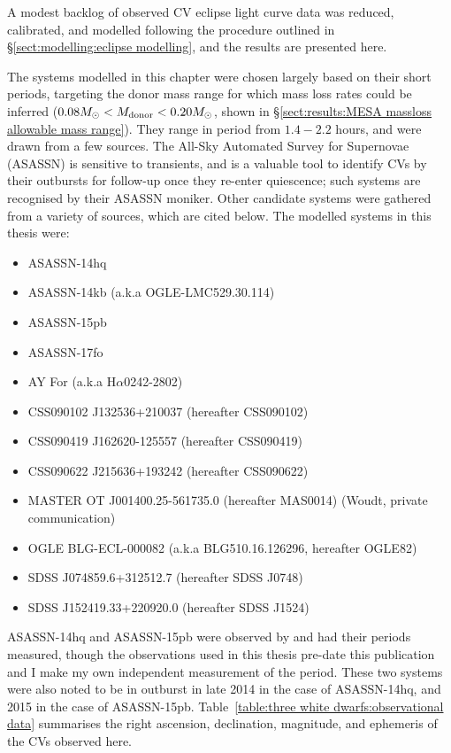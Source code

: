 \label{chpt:characterisation of 12 new CVs} %

A modest backlog of observed CV eclipse light curve data was reduced, calibrated, and modelled following the procedure outlined in \S\ref{sect:modelling:eclipse modelling}, and the results are presented here.

The systems modelled in this chapter were chosen largely based on their short periods, targeting the donor mass range for which mass loss rates could be inferred ($0.08 M_\odot < M_{\rm donor} < 0.20 M_\odot$, shown in \S\ref{sect:results:MESA massloss allowable mass range}). They range in period from $1.4 - 2.2$ hours, and were drawn from a few sources.
The All-Sky Automated Survey for Supernovae (ASASSN) \citep{shappee2014} is sensitive to transients, and is a valuable tool to identify CVs by their outbursts for follow-up once they re-enter quiescence; such systems are recognised by their ASASSN moniker.
Other candidate systems were gathered from a variety of sources, which are cited below.
The modelled systems in this thesis were:
\begin{itemize}
    \setlength\itemsep{0em}
    \item ASASSN-14hq
    \item ASASSN-14kb (a.k.a OGLE-LMC529.30.114)
    \item ASASSN-15pb
    \item ASASSN-17fo
    \item AY For (a.k.a H$\alpha$0242-2802) \citep{woudt2004}
    \item CSS090102 J132536+210037 (hereafter CSS090102) \citep{kato2012}
    \item CSS090419 J162620-125557 (hereafter CSS090419) \citep{kato2012}
    \item CSS090622 J215636+193242 (hereafter CSS090622) \citep{kato2012,thorstensen2016}
    \item MASTER OT J001400.25-561735.0 (hereafter MAS0014) (Woudt, private communication)
    \item OGLE BLG-ECL-000082 (a.k.a BLG510.16.126296, hereafter OGLE82) \citep{soszynski2016}
    \item SDSS J074859.6+312512.7 (hereafter SDSS J0748) \citep{kato2016}
    \item SDSS J152419.33+220920.0 (hereafter SDSS J1524) \citep{southworth2010,michel2013}
\end{itemize}
\newpage
ASASSN-14hq and ASASSN-15pb were observed by \citet{paterson2019} and had their periods measured, though the observations used in this thesis pre-date this publication and I make my own independent measurement of the period.
These two systems were also noted to be in outburst in late 2014 in the case of ASASSN-14hq, and 2015 in the case of ASASSN-15pb.
Table~\ref{table:three white dwarfs:observational data} summarises the right ascension, declination, magnitude, and ephemeris of the CVs observed here.


